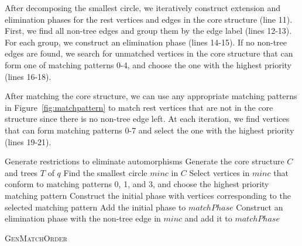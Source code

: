 After decomposing the smallest circle, we iteratively construct extension and elimination phases for the rest vertices and edges in the core structure (line 11). First, we find all non-tree edges and group them by the edge label (lines 12-13). For each group, we construct an elimination phase (lines 14-15). If no non-tree edges are found, we search for unmatched vertices in the core structure that can form one of matching patterns 0-4, and choose the one with the highest priority (lines 16-18).

After matching the core structure, we can use any appropriate matching patterns in Figure~\ref{fig:matchpattern} to match rest vertices that are not in the core structure since there is no non-tree edge left. At each iteration, we find vertices that can form matching patterns 0-7 and select the one with the highest priority (lines 19-21).


\begin{algorithm}
	Generate restrictions to eliminate automorphisms\;
	Generate the core structure $C$ and trees $T$ of $q$\;
	Find the smallest circle $minc$ in $C$\;
	Select vertices in $minc$ that conform to matching patterns 0, 1, and 3, and choose the highest priority matching pattern\;
	Construct the initial phase with vertices corresponding to the selected matching pattern\;
	Add the initial phase to $matchPhase$\;
	Construct an elimination phase with the non-tree edge in $minc$ and add it to $matchPhase$\;
	\caption{\textsc{GenMatchOrder}}
	\label{algo:genmatchorder}
\end{algorithm}



